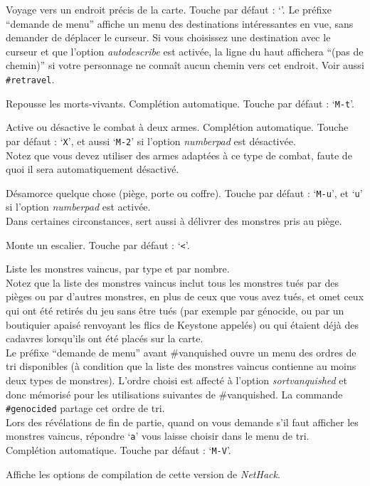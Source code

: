 \documentclass[titlepage]{article}
\begin{document}
\begin{description}[font=\mdseries\ttfamily]
\item[\#travel]
Voyage vers un endroit précis de la carte.
Touche par défaut : `\texttt{\textunderscore }'.
Le préfixe ``demande de menu'' affiche un menu des destinations intéressantes en vue,
sans demander de déplacer le curseur.
Si vous choisissez une destination avec le curseur et que l'option \textit{autodescribe}
est activée, la ligne du haut affichera ``(pas de chemin)'' si
votre personnage ne connaît aucun chemin vers cet endroit.
Voir aussi \texttt{\#retravel}.
\item[\#turn]
Repousse les morts-vivants. Complétion automatique. Touche par défaut : `\texttt{M-t}'.
\item[\#twoweapon]
Active ou désactive le combat à deux armes. Complétion automatique.
Touche par défaut : `\texttt{X}',
et aussi `\texttt{M-2}' si l'option \textit{number\textunderscore pad} est désactivée.\\
Notez que vous devez
utiliser des armes adaptées à ce type de combat, faute de quoi il sera
automatiquement désactivé.
\item[\#untrap]
Désamorce quelque chose (piège, porte ou coffre).
Touche par défaut : `\texttt{M-u}', et `\texttt{u}' si l'option \textit{number\textunderscore pad} est activée.\\
Dans certaines circonstances, sert aussi à délivrer des monstres pris au piège.
\item[\#up]
Monte un escalier. Touche par défaut : `\texttt{<}'.
\item[\#vanquished]
Liste les monstres vaincus, par type et par nombre.
\\
Notez que la liste des monstres vaincus inclut tous les monstres tués par
des pièges ou par d'autres monstres, en plus de ceux que vous avez tués, et omet
ceux qui ont été retirés du jeu sans être tués (par exemple par génocide, ou par
un boutiquier apaisé renvoyant les flics de Keystone appelés) ou qui étaient déjà
des cadavres lorsqu'ils ont été placés sur la carte.
\\
Le préfixe ``demande de menu'' avant \#vanquished ouvre
un menu des ordres de tri disponibles (à condition que la liste des monstres vaincus
contienne au moins deux types de monstres).
L'ordre choisi est affecté à l'option \textit{sortvanquished}
et donc mémorisé pour les utilisations suivantes de \#vanquished.
La commande \texttt{\#genocided} partage cet ordre de tri.
\\
Lors des révélations de fin de partie, quand on vous demande s'il faut afficher
les monstres vaincus, répondre `\texttt{a}' vous laisse choisir dans le menu de tri.
\\
Complétion automatique.
Touche par défaut : `\texttt{M-V}'.
\item[\#version]
Affiche les options de compilation de cette version de \textit{NetHack}.


\end{description}
\end{document}
